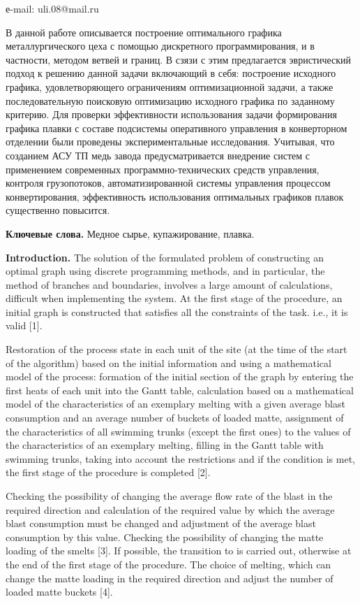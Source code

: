 е-mail: uli.08@mail.ru

В данной работе описывается построение оптимального графика
металлургического цеха с помощью дискретного программирования, и в
частности, методом ветвей и границ. В сзязи с этим предлагается
эвристический подход к решению данной задачи включающий в себя:
построение исходного графика, удовлетворяющего ограничениям
оптимизационной задачи, а также последовательную поисковую оптимизацию
исходного графика по заданному критерию. Для проверки эффективности
использования задачи формирования графика плавки с составе подсистемы
оперативного управления в конверторном отделении были проведены
экспериментальные исследования. Учитывая, что созданием АСУ ТП медь
завода предусматривается внедрение систем с применением современных
программно-технических средств управления, контроля грузопотоков,
автоматизированной системы управления процессом конвертирования,
эффективность использования оптимальных графиков плавок существенно
повысится.

\textbf{Ключевые слова.} Медное сырье, купажирование, плавка.

\textbf{Introduction.} The solution of the formulated problem of
constructing an optimal graph using discrete programming methods, and in
particular, the method of branches and boundaries, involves a large
amount of calculations, difficult when implementing the system. At the
first stage of the procedure, an initial graph is constructed that
satisfies all the constraints of the task. i.e., it is valid {[}1{]}.

Restoration of the process state in each unit of the site (at the time
of the start of the algorithm) based on the initial information and
using a mathematical model of the process: formation of the initial
section of the graph by entering the first heats of each unit into the
Gantt table, calculation based on a mathematical model of the
characteristics of an exemplary melting with a given average blast
consumption and an average number of buckets of loaded matte, assignment
of the characteristics of all swimming trunks (except the first ones) to
the values of the characteristics of an exemplary melting, filling in
the Gantt table with swimming trunks, taking into account the
restrictions and if the condition is met, the first stage of the
procedure is completed {[}2{]}.

Checking the possibility of changing the average flow rate of the blast
in the required direction and calculation of the required value by which
the average blast consumption must be changed and adjustment of the
average blast consumption by this value. Checking the possibility of
changing the matte loading of the smelts {[}3{]}. If possible, the
transition to is carried out, otherwise at the end of the first stage of
the procedure. The choice of melting, which can change the matte loading
in the required direction and adjust the number of loaded matte buckets
{[}4{]}.

